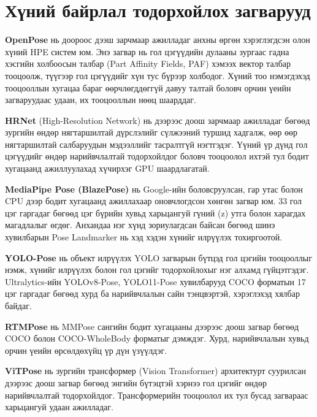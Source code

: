 \section{Хүний байрлал тодорхойлох загварууд}

\textbf{OpenPose} \cite{cao2017} нь доороос дээш зарчмаар ажилладаг анхны өргөн хэрэглэгдсэн олон хүний HPE систем юм. Энэ загвар нь гол цэгүүдийн дулааны зургаас гадна хэсгийн холбоосын талбар (Part Affinity Fields, PAF) хэмээх вектор талбар тооцоолж, түүгээр гол цэгүүдийг хүн тус бүрээр холбодог. Хүний тоо нэмэгдэхэд тооцооллын хугацаа бараг өөрчлөгддөггүй давуу талтай боловч орчин үеийн загваруудаас удаан, их тооцооллын нөөц шаарддаг.

\textbf{HRNet} (High-Resolution Network) \cite{sun2019} нь дээрээс доош зарчмаар ажилладаг бөгөөд зургийн өндөр нягтаршилтай дүрслэлийг сүлжээний туршид хадгалж, өөр өөр нягтаршилтай салбаруудын мэдээллийг тасралтгүй нэгтгэдэг. Үүний үр дүнд гол цэгүүдийг өндөр нарийвчлалтай тодорхойлдог боловч тооцоолол ихтэй тул бодит хугацаанд ажиллуулахад хүчирхэг GPU шаардлагатай.

\textbf{MediaPipe Pose (BlazePose)} \cite{bazarevsky2020} нь Google-ийн боловсруулсан, гар утас болон CPU дээр бодит хугацаанд ажиллахаар оновчлогдсон хөнгөн загвар юм. 33 гол цэг гаргадаг бөгөөд цэг бүрийн хувьд харьцангуй гүний (z) утга болон харагдах магадлалыг өгдөг. Анхандаа нэг хүнд зориулагдсан байсан бөгөөд шинэ хувилбарын Pose Landmarker нь хэд хэдэн хүнийг илрүүлэх тохиргоотой.

\textbf{YOLO-Pose} \cite{maji2022} нь объект илрүүлэх YOLO загварын бүтцэд гол цэгийн тооцооллыг нэмж, хүнийг илрүүлэх болон гол цэгийг тодорхойлохыг нэг алхамд гүйцэтгэдэг. Ultralytics-ийн \cite{ultralytics} YOLOv8-Pose, YOLO11-Pose хувилбарууд COCO форматын 17 цэг гаргадаг бөгөөд хурд ба нарийвчлалын сайн тэнцвэртэй, хэрэглэхэд хялбар байдаг.

\textbf{RTMPose} \cite{jiang2023} нь MMPose сангийн бодит хугацааны дээрээс доош загвар бөгөөд COCO болон COCO-WholeBody форматыг дэмждэг. Хурд, нарийвчлалын хувьд орчин үеийн өрсөлдөхүйц үр дүн үзүүлдэг.

\textbf{ViTPose} \cite{xu2022} нь зургийн трансформер (Vision Transformer) архитектурт суурилсан дээрээс доош загвар бөгөөд энгийн бүтэцтэй хэрнээ гол цэгийг өндөр нарийвчлалтай тодорхойлдог. Трансформерийн тооцоолол их тул бусад загвараас харьцангуй удаан ажилладаг.

